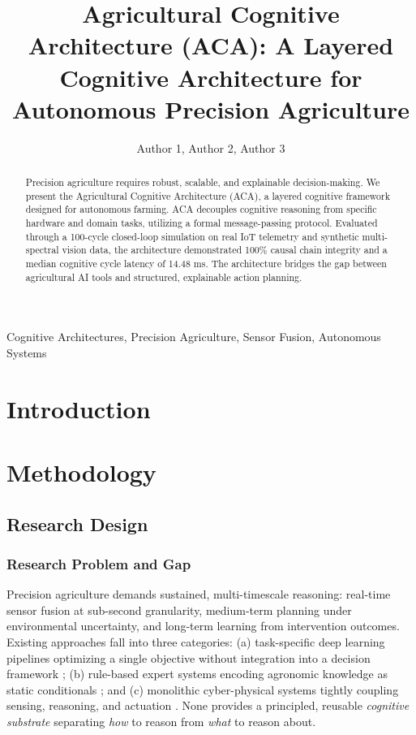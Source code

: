 \documentclass[journal, twocolumn]{IEEEtran}
\begin{document}
\title{Agricultural Cognitive Architecture (ACA): A Layered Cognitive Architecture for Autonomous Precision Agriculture}

\author{Author 1, Author 2, Author 3}

\maketitle

\begin{abstract}
Precision agriculture requires robust, scalable, and explainable decision-making. We present the Agricultural Cognitive Architecture (ACA), a layered cognitive framework designed for autonomous farming. ACA decouples cognitive reasoning from specific hardware and domain tasks, utilizing a formal message-passing protocol. Evaluated through a 100-cycle closed-loop simulation on real IoT telemetry and synthetic multi-spectral vision data, the architecture demonstrated 100\% causal chain integrity and a median cognitive cycle latency of 14.48 ms. The architecture bridges the gap between agricultural AI tools and structured, explainable action planning.
\end{abstract}

\begin{IEEEkeywords}
Cognitive Architectures, Precision Agriculture, Sensor Fusion, Autonomous Systems
\end{IEEEkeywords}

\section{Introduction}

\section{Methodology}
\subsection{Research Design}
\subsubsection{Research Problem and Gap}
Precision agriculture demands sustained, multi-timescale reasoning: real-time sensor fusion at sub-second granularity, medium-term planning under environmental uncertainty, and long-term learning from intervention outcomes. Existing approaches fall into three categories: (a) task-specific deep learning pipelines optimizing a single objective without integration into a decision framework \cite{1}; (b) rule-based expert systems encoding agronomic knowledge as static conditionals \cite{2}; and (c) monolithic cyber-physical systems tightly coupling sensing, reasoning, and actuation \cite{3}. None provides a principled, reusable \textit{cognitive substrate} separating \textit{how} to reason from \textit{what} to reason about.
\end{document}
